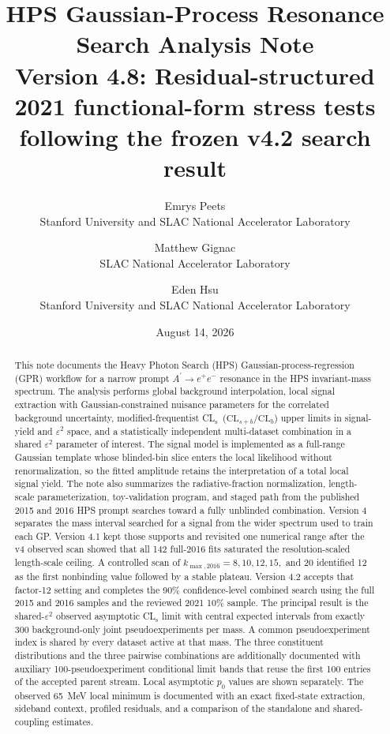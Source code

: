 \documentclass[11pt]{article}
\title{\vspace{-1.0em}HPS Gaussian-Process Resonance Search Analysis Note\\
\large Version 4.8: Residual-structured 2021 functional-form stress tests
following the frozen v4.2 search result}
\author{
Emrys Peets\\Stanford University and SLAC National Accelerator Laboratory
\and
Matthew Gignac\\SLAC National Accelerator Laboratory
\and
Eden Hsu\\Stanford University and SLAC National Accelerator Laboratory
}
\date{August 14, 2026}
\newcommand{\eps}{\varepsilon}
\newcommand{\CLs}{CL$_\mathrm{s}$}
\begin{document}
\maketitle

\begin{abstract}
This note documents the Heavy Photon Search (HPS) Gaussian-process-regression (GPR)
workflow for a narrow prompt
$A^\prime \rightarrow e^+e^-$ resonance in the HPS invariant-mass spectrum. The
analysis performs global background interpolation, local signal extraction with
Gaussian-constrained nuisance parameters for the correlated background uncertainty,
modified-frequentist
\CLs\ ($\mathrm{CL}_{s+b}/\mathrm{CL}_b$) upper limits in signal-yield and
$\eps^2$ space, and a statistically independent multi-dataset combination in a shared
$\eps^2$ parameter of interest. The signal model is implemented as a full-range
Gaussian template whose blinded-bin slice enters the local likelihood without
renormalization, so the fitted amplitude retains the interpretation of a total local
signal yield. The note also summarizes the radiative-fraction normalization,
length-scale parameterization, toy-validation program, and staged path from the
published 2015 and 2016 HPS prompt searches toward a fully unblinded combination.
Version 4 separates the mass interval searched for a signal from the wider spectrum
used to train each GP. Version 4.1 kept those supports and revisited one numerical
range after the v4 observed scan showed that all 142 full-2016 fits saturated the
resolution-scaled length-scale ceiling. A controlled scan of
$k_{\max,2016}=8,10,12,15,$ and 20 identified 12 as the first nonbinding value
followed by a stable plateau. Version 4.2 accepts that factor-12 setting and completes
the 90\% confidence-level combined search using the full 2015 and 2016 samples and
the reviewed 2021 10\% sample. The principal result is the shared-$\eps^2$ observed
asymptotic \CLs{} limit with central expected intervals from exactly 300
background-only joint pseudoexperiments per mass. A common pseudoexperiment index is
shared by every dataset active at that mass. The three constituent distributions
and the three pairwise combinations are additionally documented with auxiliary
100-pseudoexperiment conditional limit bands that reuse the first 100 entries of
the accepted parent stream. Local asymptotic $p_0$ values are shown separately.
The observed 65~MeV local minimum is
documented with an exact fixed-state extraction, sideband context, profiled
residuals, and a comparison of the standalone and shared-coupling estimates.

\end{abstract}
\end{document}
